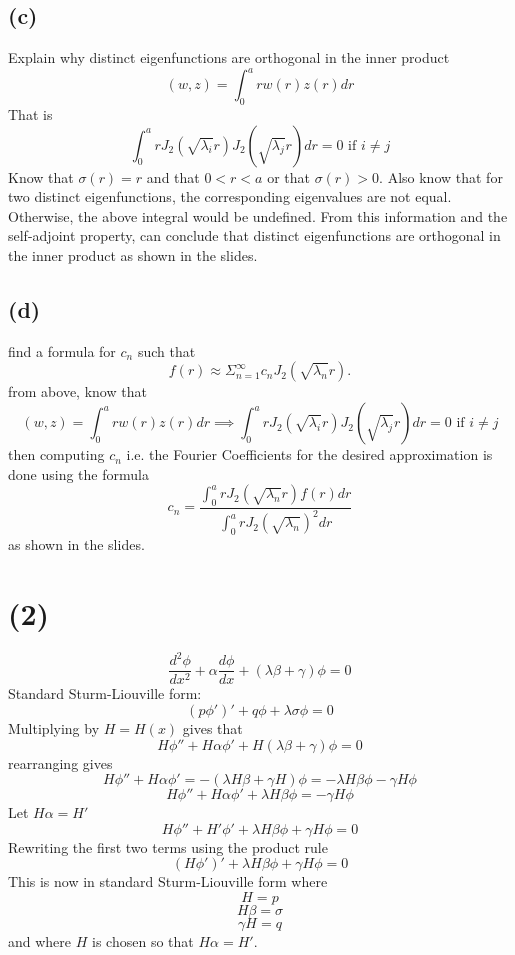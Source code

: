 \documentclass[preview,12pt]{article}
\begin{document}
    \subsection*{(c)}
        Explain why distinct eigenfunctions are orthogonal in the inner product
        $$(w,z)=\int_0^a rw(r)z(r)dr$$
        That is
        $$\int_0^arJ_2(\sqrt{\lambda_i}r)J_2(\sqrt{\lambda_j}r)dr=0 \textrm{ if } i\neq j$$
        Know that $\sigma(r)=r$ and that $0<r<a$ or that $\sigma(r)>0$. \newline
        Also know that for two distinct eigenfunctions, the corresponding eigenvalues are not equal.  Otherwise, the above integral would be undefined. \newline
        From this information and the self-adjoint property, can conclude that distinct eigenfunctions are orthogonal in the inner product as shown in the slides. 
    
    \subsection*{(d)}
        find a formula for $c_n$ such that
        $$f(r)\approx \Sigma_{n=1}^\infty c_n J_2(\sqrt{\lambda_n}r).$$
        from above, know that
        $$(w,z)=\int_0^a rw(r)z(r)dr \implies \int_0^arJ_2(\sqrt{\lambda_i}r)J_2(\sqrt{\lambda_j}r)dr=0 \textrm{ if } i\neq j$$
        then computing $c_n$ i.e. the Fourier Coefficients for the desired approximation is done using the formula
        $$c_n=\frac{\int_0^a rJ_2(\sqrt{\lambda_n}r)f(r)dr}{\int_0^a rJ_2(\sqrt{\lambda_n})^2dr}$$ as shown in the slides.
    
\section*{(2)}
    $$\frac{d^2\phi}{dx^2}+\alpha\frac{d\phi}{dx}+(\lambda \beta+ \gamma)\phi=0$$
    Standard Sturm-Liouville form:
    $$(p\phi')'+q\phi+\lambda\sigma\phi = 0$$
    Multiplying by $H=H(x)$ gives that
    $$H\phi ''+H\alpha \phi '+H(\lambda\beta+\gamma)\phi=0$$
    rearranging gives
    $$H\phi ''+H\alpha \phi'=-(\lambda H \beta +\gamma H)\phi=-\lambda H \beta \phi - \gamma H \phi$$
    $$H\phi ''+H\alpha \phi'+\lambda H \beta \phi=- \gamma H \phi$$
    Let $H\alpha=H'$ 
    $$H\phi ''+H' \phi'+\lambda H \beta \phi+\gamma H \phi=0$$
    Rewriting the first two terms using the product rule
    $$(H\phi')'+\lambda H \beta \phi+\gamma H\phi=0$$
    This is now in standard Sturm-Liouville form where
    $$H=p$$
    $$H\beta=\sigma$$
    $$\gamma H=q$$
    and where $H$ is chosen so that $H\alpha=H'$.
    
\end{document}
